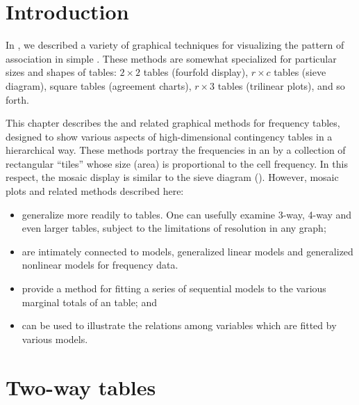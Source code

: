 \documentclass[11pt]{book}
\begin{document}

\section{Introduction}\label{sec:mosaic-intro}


In , we described a variety of graphical techniques
for visualizing the pattern of association in simple \ctabs.
These methods are somewhat specialized for particular
sizes and shapes of tables: 
$2 \times 2$ tables (fourfold display),
$r \times c$ tables (sieve diagram),
square tables (agreement charts), 
$r \times 3$ tables (trilinear plots), and so forth.

This chapter describes the
 and related graphical methods
for \nway frequency tables, designed to show
various aspects of high-dimensional contingency tables in a hierarchical way.
These methods portray the
frequencies in an \nway
\ctab  by a collection of rectangular ``tiles''
whose size (area) is proportional to the cell frequency.
In this respect, the mosaic display is similar to the sieve diagram ().
However, mosaic plots and related methods described here:
\begin{itemize}
\item generalize more readily to \nway tables.  One can usefully examine
3-way, 4-way and even larger tables, subject to the limitations
of resolution in any graph;
\item are intimately connected to \loglin models, generalized linear models
and generalized nonlinear models for frequency data.
\item provide a method for fitting a series of sequential \loglin
models to the various marginal totals of an \nway table; and
\item can be used to illustrate the relations among variables which
are fitted by various \loglin models.
\end{itemize}


\section{Two-way tables}\label{sec:mosaic-twoway}
\end{document}
